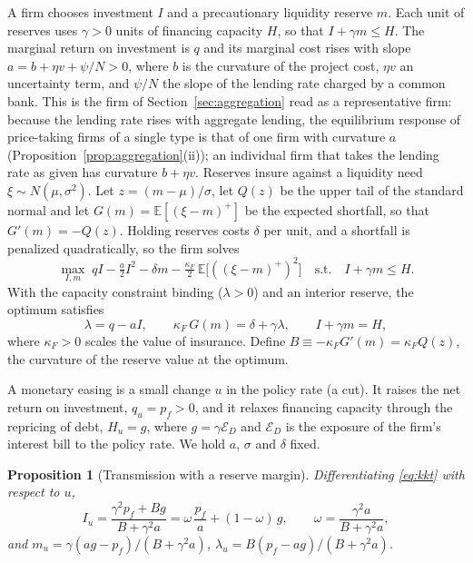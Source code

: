 \documentclass[11pt]{article}
\newtheorem{proposition}{Proposition}
\theoremstyle{remark}
\begin{document}
A firm chooses investment $I$ and a precautionary liquidity reserve $m$. Each unit of reserves uses $\gamma>0$ units of
financing capacity $H$, so that $I+\gamma m\le H$. The marginal return on investment is $q$ and its marginal cost rises with
slope $a=b+\eta v+\psi/N>0$, where $b$ is the curvature of the project cost, $\eta v$ an uncertainty term, and $\psi/N$ the slope
of the lending rate charged by a common bank. This is the firm of Section~\ref{sec:aggregation} read as a representative firm: because the
lending rate rises with aggregate lending, the equilibrium response of price-taking firms of a single type is that of one firm with
curvature $a$ (Proposition~\ref{prop:aggregation}(ii)); an individual firm that takes the lending rate as given has curvature
$b+\eta v$. Reserves insure against a liquidity need
$\xi\sim N(\mu,\sigma^2)$. Let $z=(m-\mu)/\sigma$, let $Q(z)$ be the upper tail of the standard normal and let
$G(m)=\mathbb{E}[(\xi-m)^+]$ be the expected shortfall, so that $G'(m)=-Q(z)$. Holding reserves costs $\delta$ per unit, and a
shortfall is penalized quadratically, so the firm solves
\[
\max_{I,m}\; qI-\tfrac{a}{2}I^2-\delta m-\tfrac{\kappa_F}{2}\,\mathbb{E}\big[((\xi-m)^+)^2\big]\quad\text{s.t.}\quad I+\gamma m\le H .
\]
With the capacity constraint binding ($\lambda>0$) and an interior reserve, the optimum satisfies
\begin{equation}\label{eq:kkt}
\lambda = q-aI,\qquad \kappa_F\,G(m)=\delta+\gamma\lambda,\qquad I+\gamma m=H,
\end{equation}
where $\kappa_F>0$ scales the value of insurance. Define
$B\equiv-\kappa_F G'(m)=\kappa_F Q(z)$, the curvature of the reserve value at the optimum.

A monetary easing is a small change $u$ in the policy rate (a cut). It raises the net return on investment, $q_u=p_f>0$, and it
relaxes financing capacity through the repricing of debt, $H_u=g$, where $g=\gamma\mathcal{E}_D$ and $\mathcal{E}_D$ is the
exposure of the firm's interest bill to the policy rate. We hold $a$, $\sigma$ and $\delta$ fixed.

\begin{proposition}[Transmission with a reserve margin]\label{prop:transmission}
Differentiating \eqref{eq:kkt} with respect to $u$,
\begin{equation}\label{eq:Iu}
I_u=\frac{\gamma^2 p_f+B g}{B+\gamma^2 a}=\omega\,\frac{p_f}{a}+(1-\omega)\,g,\qquad
\omega=\frac{\gamma^2 a}{B+\gamma^2 a},
\end{equation}
and $m_u=\gamma(a g-p_f)/(B+\gamma^2 a)$, $\lambda_u=B(p_f-a g)/(B+\gamma^2 a)$.
\end{proposition}
\end{document}
